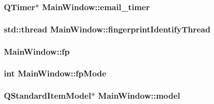 \subsubsection[{email\+\_\+timer}]{\setlength{\rightskip}{0pt plus 5cm}Q\+Timer$\ast$ Main\+Window\+::email\+\_\+timer\hspace{0.3cm}{\ttfamily [private]}}\label{class_main_window_a145bbdf02640590c1d953827a139fb48}
\hypertarget{class_main_window_ae27e65bcfce4d59fd1b51328b44e5a3f}{}
\subsubsection[{fingerprint\+Identify\+Thread}]{\setlength{\rightskip}{0pt plus 5cm}std\+::thread Main\+Window\+::fingerprint\+Identify\+Thread\hspace{0.3cm}{\ttfamily [private]}}\label{class_main_window_ae27e65bcfce4d59fd1b51328b44e5a3f}
\hypertarget{class_main_window_ae9b267fa7badc7c10d9f03ab6dd99a21}{}
\subsubsection[{fp}]{ Main\+Window\+::fp\hspace{0.3cm}{\ttfamily [private]}}\label{class_main_window_ae9b267fa7badc7c10d9f03ab6dd99a21}
\hypertarget{class_main_window_a122902405a566547943551c2e1a01b51}{}
\subsubsection[{fp\+Mode}]{\setlength{\rightskip}{0pt plus 5cm}int Main\+Window\+::fp\+Mode\hspace{0.3cm}{\ttfamily [private]}}\label{class_main_window_a122902405a566547943551c2e1a01b51}
\hypertarget{class_main_window_aa1a1f8ce9c37a7ac70d21402759638b3}{}
\subsubsection[{model}]{\setlength{\rightskip}{0pt plus 5cm}Q\+Standard\+Item\+Model$\ast$ Main\+Window\+::model\hspace{0.3cm}{\ttfamily [private]}}\label{class_main_window_aa1a1f8ce9c37a7ac70d21402759638b3}
\hypertarget{class_main_window_a3731e42d8e85714bda210c44605974df}{}
